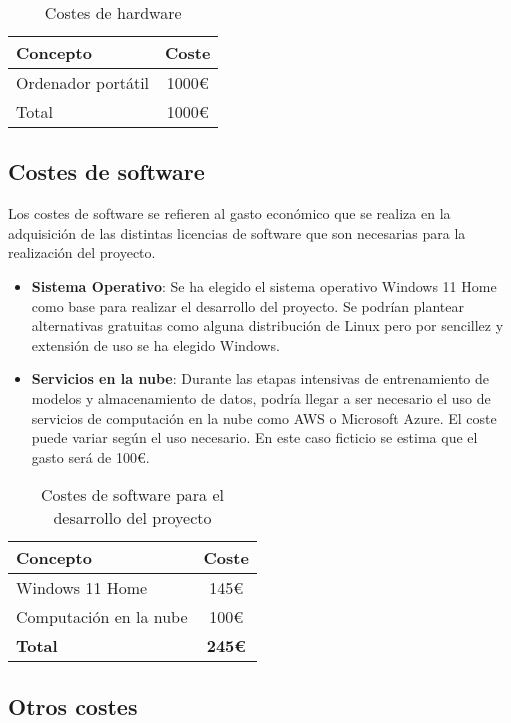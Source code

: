 \begin{table}[h]
\centering
\begin{tabular}{|l|c|}
\hline
\textbf{Concepto} & \textbf{Coste} \\ 
\hline
Ordenador portátil & 1000€ \\ 
\hline
Total & 1000€ \\ 
\hline
\end{tabular}
\caption{Costes de hardware}
\end{table}

\subsection{Costes de software}
Los costes de software se refieren al gasto económico que se realiza en la adquisición de las distintas licencias de software que son necesarias para la realización del proyecto.

\begin{itemize}
\tightlist
\item \textbf{Sistema Operativo}: Se ha elegido el sistema operativo Windows 11 Home como base para realizar el desarrollo del proyecto. Se podrían plantear alternativas gratuitas como alguna distribución de Linux pero por sencillez y extensión de uso se ha elegido Windows.

\item \textbf{Servicios en la nube}: Durante las etapas intensivas de entrenamiento de modelos y almacenamiento de datos, podría llegar a ser necesario el uso de servicios de computación en la nube como AWS o Microsoft Azure. El coste puede variar según el uso necesario. En este caso ficticio se estima que el gasto será de 100€.
\end{itemize}

\begin{table}[h]
\centering
\begin{tabular}{|l|c|}
\hline
\textbf{Concepto} & \textbf{Coste} \\
\hline
Windows 11 Home & 145€ \\
Computación en la nube & 100€ \\
\hline
\textbf{Total} & \textbf{245€} \\
\hline
\end{tabular}
\caption{Costes de software para el desarrollo del proyecto}
\end{table}

\subsection{Otros costes}

